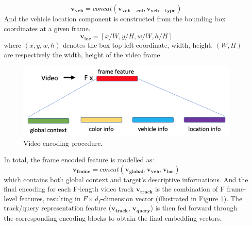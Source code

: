 \[ 
\mathbf{v_{veh}} = concat(\mathbf{v_{veh-col}}, \mathbf{v_{veh-type}})
\]
And the vehicle location component is constructed from the bounding box coordinates at a given frame.
\[
\mathbf{v_{loc}} = [x/W, y/H, w/W, h/H]
\]
where $(x, y, w, h)$ denotes the box top-left coordinate, width, height. $(W, H)$ are respectively the width, height of the video frame. 
\begin{figure}[!h]
    \centering
    \includegraphics[width=\linewidth]{images/methods/video_encoding.png}
    \caption{Video encoding procedure.}
    \label{fig:video_encoding}
\end{figure}

In total, the frame encoded feature is modelled as:
\[
\mathbf{v_{frame}} = concat(\mathbf{v_{global}}, \mathbf{v_{veh}}, \mathbf{v_{loc}})
\]
which contains both global context and target's descriptive informations. And the final encoding for each F-length video track $\mathbf{v_{track}}$ is the combination of F frame-level features, resulting in $F \times d_f$-dimension vector (illustrated in Figure \ref{fig:video_encoding}).
The track/query representation feature ($\mathbf{v_{track}}$, $\mathbf{v_{query}}$) is then fed forward through the corresponding encoding blocks to obtain the final embedding vectors.

